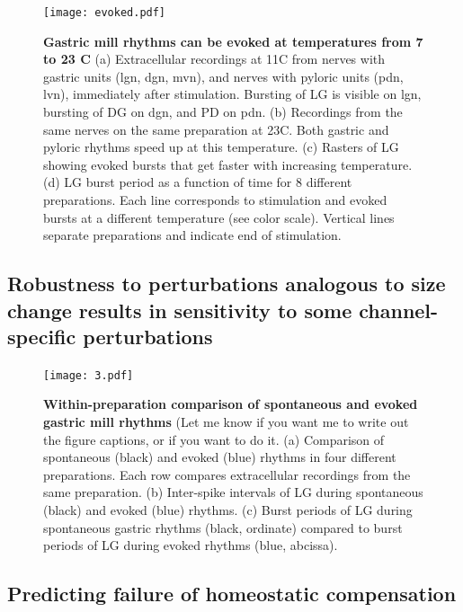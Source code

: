 \documentclass[9pt,lineno]{elife}
\begin{document}
\begin{figure}
\begin{fullwidth}
\texttt{[image: evoked.pdf]}

\caption{\textbf{Gastric mill rhythms can be evoked at temperatures from 7 to 23 C }  (a) Extracellular recordings at 11\degree C from nerves with gastric units (lgn, dgn, mvn), and nerves with pyloric units (pdn, lvn), immediately after stimulation. Bursting of LG is visible on lgn, bursting of DG on dgn, and PD on pdn. (b) Recordings from the same nerves on the same preparation at 23\degree C. Both gastric and pyloric rhythms speed up at this temperature. (c) Rasters of LG showing evoked bursts that get faster with increasing temperature. (d) LG burst period as a function of time for 8 different preparations. Each line corresponds to stimulation and evoked bursts at a different temperature (see color scale). Vertical lines separate preparations and indicate end of stimulation. } 
\label{fig:2}
\end{fullwidth}
\end{figure}




\subsection{Robustness to perturbations analogous to size change results in sensitivity to some channel-specific perturbations}


\begin{figure}
\begin{fullwidth}
\texttt{[image: 3.pdf]}

\caption{\textbf{Within-preparation comparison of spontaneous and evoked gastric mill rhythms} (Let me know if you want me to write out the figure captions, or if you want to do it. (a) Comparison of spontaneous (black) and evoked (blue) rhythms in four different preparations. Each row compares extracellular recordings from the same preparation. (b) Inter-spike intervals of LG during spontaneous (black) and evoked (blue) rhythms. (c) Burst periods of LG during spontaneous gastric rhythms (black, ordinate) compared to burst periods of LG during evoked rhythms (blue, abcissa).  }
\label{fig:2}
\end{fullwidth}
\end{figure}


\lipsum[1-4]

\subsection{Predicting failure of homeostatic compensation}
\end{document}
